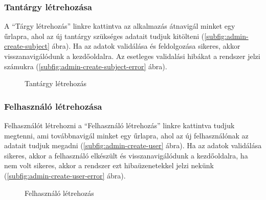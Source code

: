 \subsubsection{Tantárgy létrehozása}
A ``Tárgy létrehozás'' linkre kattintva az alkalmazás átnavigál minket egy űrlapra, ahol az új tantárgy szükséges adatait tudjuk kitölteni (\ref{subfig:admin-create-subject} ábra). Ha az adatok validálása és feldolgozása sikeres, akkor visszanavigálódunk a kezdőoldalra. Az esetleges validalási hibákat a rendszer jelzi számukra (\ref{subfig:admin-create-subject-error} ábra).
\begin{figure}[H]
	\centering
	\hspace{5pt}
	\caption{Tantárgy létrehozás}
	\label{fig:admin-create-subject}
\end{figure}
\subsubsection{Felhasználó létrehozása}
Felhasználót létrehozni a ``Felhasználó létrehozás'' linkre kattintva tudjuk megtenni, ami továbbnavigál minket egy űrlapra, ahol az új felhasználónak az adatait tudjuk megadni (\ref{subfig:admin-create-user} ábra). Ha az adatok validálása sikeres, akkor a felhasználó elkészült és visszanavigálódunk a kezdőoldalra, ha nem volt sikeres, akkor a rendszer ezt hibaüzenetekkel jelzi nekünk (\ref{subfig:admin-create-user-error} ábra).
\begin{figure}[H]
	\centering
	\hspace{5pt}
	\caption{Felhasználó létrehozás}
	\label{fig:admin-create-user}
\end{figure}
